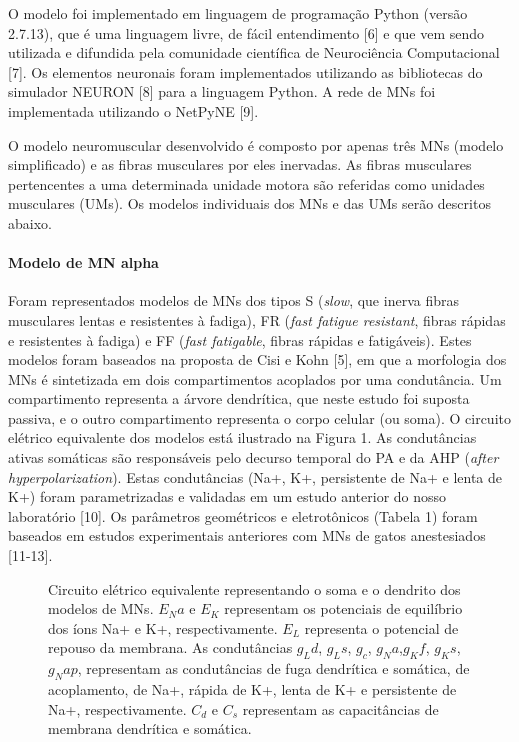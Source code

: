 O modelo foi implementado em linguagem de programação Python (versão 2.7.13), que é uma linguagem livre, de fácil entendimento [6] e que vem sendo utilizada e difundida pela comunidade científica de Neurociência Computacional [7]. Os elementos neuronais foram implementados utilizando as bibliotecas do simulador NEURON [8] para a linguagem Python. A rede de MNs foi implementada utilizando o NetPyNE [9].

O modelo neuromuscular desenvolvido é composto por apenas três MNs (modelo simplificado) e as fibras musculares por eles inervadas. As fibras musculares pertencentes a uma determinada unidade motora são referidas como unidades musculares (UMs). Os modelos individuais dos MNs e das UMs serão descritos abaixo.

\paragraph{Modelo de MN alpha}
Foram representados modelos de MNs dos tipos S (\emph{slow}, que inerva fibras musculares lentas e resistentes à fadiga), FR (\emph{fast fatigue resistant}, fibras rápidas e resistentes à fadiga) e FF (\emph{fast fatigable}, fibras rápidas e fatigáveis). Estes modelos foram baseados na proposta de Cisi e Kohn [5], em que a morfologia dos MNs é sintetizada em dois compartimentos acoplados por uma condutância. Um compartimento representa a árvore dendrítica, que neste estudo foi suposta passiva, e o outro compartimento representa o corpo celular (ou soma). O circuito elétrico equivalente dos modelos está ilustrado na Figura 1. As condutâncias ativas somáticas são responsáveis pelo decurso temporal do PA e da AHP (\emph{after hyperpolarization}). Estas condutâncias (Na+, K+, persistente de Na+ e lenta de K+) foram parametrizadas e validadas em um estudo anterior do nosso laboratório [10]. Os parâmetros geométricos e eletrotônicos (Tabela 1) foram baseados em estudos experimentais anteriores com MNs de gatos anestesiados [11-13].

\begin{figure}[h]
  \centering
  \caption{Circuito elétrico equivalente representando o soma e o dendrito dos modelos de MNs. $E_Na$ e $E_K$ representam os potenciais de equilíbrio dos íons Na+ e K+, respectivamente. $E_L$ representa o potencial de repouso da membrana. As condutâncias $g_Ld$, $g_Ls$, $g_c$, $g_Na$,$g_Kf$, $g_Ks$, $g_Nap$, representam as condutâncias de fuga dendrítica e somática, de acoplamento, de Na+, rápida de K+, lenta de K+ e persistente de Na+, respectivamente. $C_d$ e $C_s$ representam as capacitâncias de membrana dendrítica e somática.}
  \label{fig:fig1}
\end{figure}

